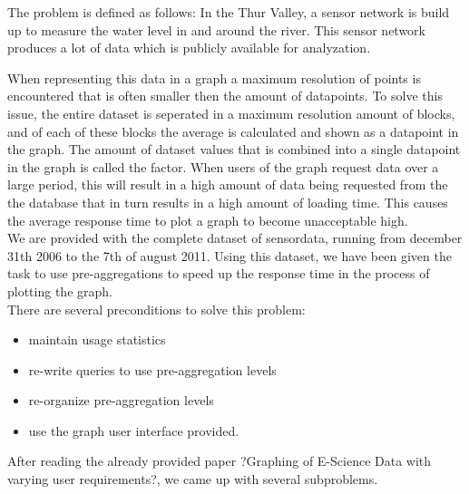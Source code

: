 The problem is defined as follows: In the Thur Valley, a sensor network is build up to measure the water level in and around the river. This sensor network produces a lot of data which is publicly available for analyzation. 

When representing this data in a graph a maximum resolution of points is encountered that is often smaller then the amount of datapoints. To solve this issue, the entire dataset is seperated in a maximum resolution amount of blocks, and of each of these blocks the average is calculated and shown as a datapoint in the graph. The amount of dataset values that is combined into a single datapoint in the graph is called the factor. When users of the graph request data over a large period, this will result in a high amount of data being requested from the the database that in turn results in a high amount of loading time. This causes the average response time to plot a graph to become unacceptable high.\\



We are provided with the complete dataset of sensordata, running from december 31th 2006 to the 7th of august 2011. Using this dataset, we have been given the task to use pre-aggregations to speed up the response time in the process of plotting the graph.\\

There are several preconditions to solve this problem:
\begin{itemize}
\item maintain usage statistics 
\item re-write queries to use pre-aggregation levels
\item re-organize pre-aggregation levels
\item use the graph user interface provided.
\end{itemize}

After reading the already provided paper ?Graphing of E-Science Data with varying user requirements?, we came up with several subproblems.\\

